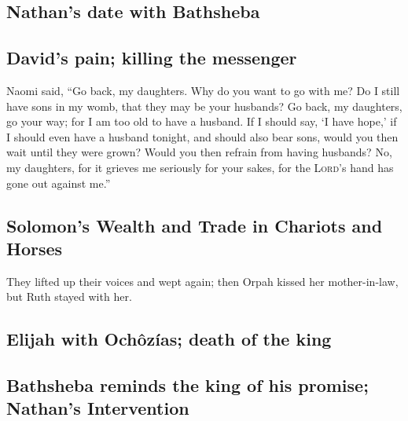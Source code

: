 \hypertarget{nathans-date-with-bathsheba}{%
\subsection{Nathan's date with
Bathsheba}\label{nathans-date-with-bathsheba}}

\hypertarget{davids-pain-killing-the-messenger}{%
\subsection{David's pain; killing the
messenger}\label{davids-pain-killing-the-messenger}}

 Naomi said, ``Go back, my daughters. Why do you want to
go with me? Do I still have sons in my womb, that they may be your
husbands?  Go back, my daughters, go your way; for I am
too old to have a husband. If I should say, `I have hope,' if I should
even have a husband tonight, and should also bear sons, 
would you then wait until they were grown? Would you then refrain from
having husbands? No, my daughters, for it grieves me seriously for your
sakes, for the \textsc{Lord}'s hand has gone out against me.''

\hypertarget{solomons-wealth-and-trade-in-chariots-and-horses}{%
\subsection{Solomon's Wealth and Trade in Chariots and
Horses}\label{solomons-wealth-and-trade-in-chariots-and-horses}}

 They lifted up their voices and wept again; then Orpah
kissed her mother-in-law, but Ruth stayed with her.

\hypertarget{elijah-with-ochuxf4zuxedas-death-of-the-king}{%
\subsection{Elijah with Ochôzías; death of the
king}\label{elijah-with-ochuxf4zuxedas-death-of-the-king}}

\hypertarget{bathsheba-reminds-the-king-of-his-promise-nathans-intervention}{%
\subsection{Bathsheba reminds the king of his promise; Nathan's
Intervention}\label{bathsheba-reminds-the-king-of-his-promise-nathans-intervention}}

